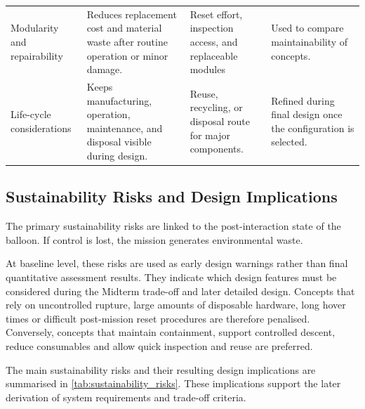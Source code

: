 \begin{longtable}{p{} p{} p{} p{}}
Modularity and repairability & Reduces replacement cost and material waste after routine operation or minor damage. & Reset effort, inspection access, and replaceable modules & Used to compare maintainability of concepts. \\

Life-cycle considerations & Keeps manufacturing, operation, maintenance, and disposal visible during design. & Reuse, recycling, or disposal route for major components. & Refined during final design once the configuration is selected. \\



\end{longtable}

\subsection*{Sustainability Risks and Design Implications}

The primary sustainability risks are linked to the post-interaction state of the balloon. If control is lost, the mission generates environmental waste. %




At baseline level, these risks are used as early design warnings rather than final quantitative assessment results. They indicate which design features must be considered during the Midterm trade-off and later detailed design. Concepts that rely on uncontrolled rupture, large amounts of disposable hardware, long hover times or difficult post-mission reset procedures are therefore penalised. Conversely, concepts that maintain containment, support controlled descent, reduce consumables and allow quick inspection and reuse are preferred.

The main sustainability risks and their resulting design implications are summarised in \autoref{tab:sustainability_risks}. These implications support the later derivation of system requirements and trade-off criteria.




